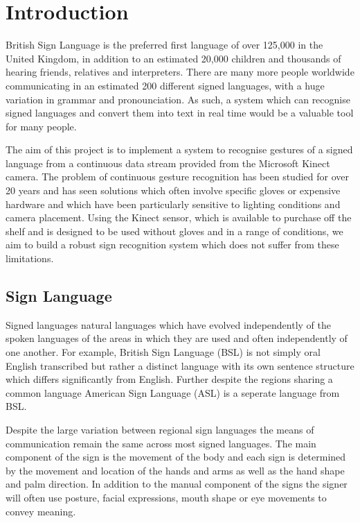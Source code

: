 \chapter{Introduction}
\ifpdf
    \graphicspath{{Introduction/IntroductionFigs/PNG/}{Introduction/IntroductionFigs/PDF/}{Introduction/IntroductionFigs/}}
\else
    \graphicspath{{Introduction/IntroductionFigs/EPS/}{Introduction/IntroductionFigs/}}
\fi

British Sign Language is the preferred first language of over 125,000 in the United Kingdom, in addition to an estimated 20,000 children and thousands of hearing friends, relatives and interpreters. There are many more people worldwide communicating in an estimated 200 different signed languages, with a huge variation in grammar and pronounciation. As such, a system which can recognise signed languages and convert them into text in real time would be a valuable tool for many people. 

The aim of this project is to implement a system to recognise gestures of a signed language from a continuous data stream provided from the Microsoft Kinect camera. The problem of continuous gesture recognition has been studied for over 20 years and has seen solutions which often involve specific gloves or expensive hardware and which have been particularly sensitive to lighting conditions and camera placement. Using the Kinect sensor, which is available to purchase off the shelf and is designed to be used without gloves and in a range of conditions, we aim to build a robust sign recognition system which does not suffer from these limitations.

\section{Sign Language}
Signed languages natural languages which have evolved independently of the spoken languages of the areas in which they are used and often independently of one another. For example, British Sign Language (BSL) is not simply oral English transcribed but rather a distinct language with its own sentence structure which differs significantly from English. Further despite the regions sharing a common language American Sign Language (ASL) is a seperate language from BSL.

Despite the large variation between regional sign languages the means of communication remain the same across most signed languages. The main component of the sign is the movement of the body and each sign is determined by the movement and location of the hands and arms as well as the hand shape and palm direction. In addition to the manual component of the signs the signer will often use posture, facial expressions, mouth shape or eye movements to convey meaning.

